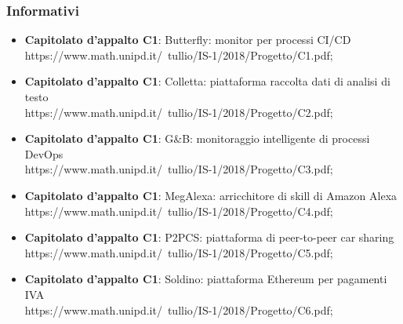 \subsubsection{Informativi}
\begin{itemize}
	\item \textbf{Capitolato d'appalto C1}: Butterfly: monitor per processi CI/CD \\
	\textsf{https://www.math.unipd.it/~tullio/IS-1/2018/Progetto/C1.pdf};
	\item \textbf{Capitolato d'appalto C1}: Colletta: piattaforma raccolta dati di analisi di testo\\
	\textsf{https://www.math.unipd.it/~tullio/IS-1/2018/Progetto/C2.pdf};
	\item \textbf{Capitolato d'appalto C1}: G\&B: monitoraggio intelligente di processi DevOps \\
	\textsf{https://www.math.unipd.it/~tullio/IS-1/2018/Progetto/C3.pdf};
	\item \textbf{Capitolato d'appalto C1}: MegAlexa: arricchitore di skill di Amazon Alexa \\
	\textsf{https://www.math.unipd.it/~tullio/IS-1/2018/Progetto/C4.pdf};
	\item \textbf{Capitolato d'appalto C1}: P2PCS: piattaforma di peer-to-peer car sharing \\
	\textsf{https://www.math.unipd.it/~tullio/IS-1/2018/Progetto/C5.pdf};
	\item \textbf{Capitolato d'appalto C1}: Soldino: piattaforma Ethereum per pagamenti IVA \\
	\textsf{https://www.math.unipd.it/~tullio/IS-1/2018/Progetto/C6.pdf};
\end{itemize}

	
	

